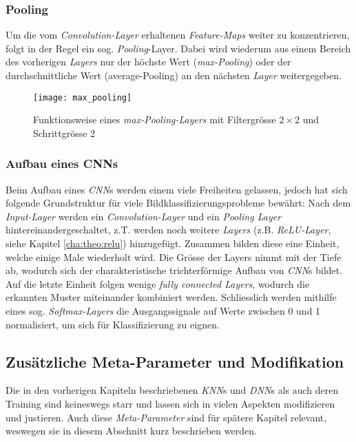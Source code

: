 \subsubsection{Pooling}
Um die vom \textit{Convolution-Layer} erhaltenen \textit{Feature-Maps} weiter zu konzentrieren, folgt in der Regel ein sog. \textit{Pooling}-Layer. Dabei wird wiederum aus einem Bereich des vorherigen \textit{Layers} nur der höchste Wert (\textit{max-Pooling}) oder der durchschnittliche Wert (average-Pooling) an den nächsten \textit{Layer} weitergegeben.

\begin{figure}[h]
	\centering
	\texttt{[image: max\_pooling]}
	\caption[\textit{\textit{max-Pooling-Layer}}]{Funktionsweise eines \textit{max-Pooling-Layers} mit Filtergrösse $2\times 2$ und Schrittgrösse 2}
	\label{img:max_pooling}
\end{figure}


\subsubsection{Aufbau eines CNNs}

Beim Aufbau eines \textit{CNN}s werden einem viele Freiheiten gelassen, jedoch hat sich folgende Grundstruktur für viele Bildklassifizierungsprobleme bewährt: Nach dem \textit{Input-Layer} werden ein \textit{Convolution-Layer} und ein \textit{Pooling Layer} hintereinandergeschaltet, z.T. werden noch weitere \textit{Layers} (z.B. \textit{ReLU-Layer}, siehe Kapitel \ref{cha:theo:relu}) hinzugefügt. Zusammen bilden diese eine Einheit, welche einige Male wiederholt wird. Die Grösse der Layers nimmt mit der Tiefe ab, wodurch sich der charakteristische trichterförmige Aufbau von \textit{CNN}s bildet. Auf die letzte Einheit folgen wenige \textit{fully connected Layers}, wodurch die erkannten Muster miteinander kombiniert werden. Schliesslich werden mithilfe eines sog. \textit{Softmax-Layers} die Ausgangssignale auf Werte zwischen 0 und 1 normalisiert, um sich für Klassifizierung zu eignen.


\subsection{Zusätzliche Meta-Parameter und Modifikation}
Die in den vorherigen Kapiteln beschriebenen \textit{KNN}s und \textit{DNN}s als auch deren Training sind keineswegs starr und lassen sich in vielen Aspekten modifizieren und justieren. Auch diese \textit{Meta-Parameter} sind für spätere Kapitel relevant, weswegen sie in diesem Abschnitt kurz beschrieben werden. 

